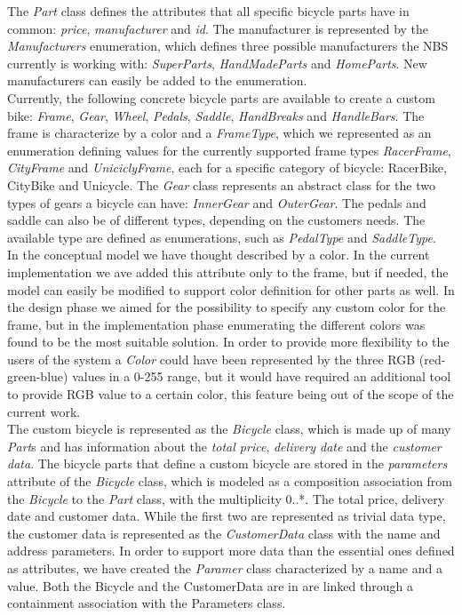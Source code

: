 \noindent The \emph{Part} class defines the attributes that all specific bicycle
parts have in common: \emph{price}, \emph{manufacturer} and \emph{id}. The
manufacturer is represented by the \emph{Manufacturers} enumeration, which
defines three possible manufacturers the NBS currently is working with:
\emph{SuperParts}, \emph{HandMadeParts} and \emph{HomeParts}. New manufacturers
can easily be added to the enumeration.\\

\noindent Currently, the following concrete bicycle parts are available to
create a custom bike: \emph{Frame}, \emph{Gear}, \emph{Wheel}, \emph{Pedals}, \emph{Saddle},
\emph{HandBreaks} and \emph{HandleBars}. The frame is characterize by
a color and a \emph{FrameType}, which we represented as an enumeration defining
values for the currently supported frame types \emph{RacerFrame}, \emph{CityFrame} and
\emph{UniciclyFrame}, each for a specific category of bicycle: RacerBike,
CityBike and Unicycle. The \emph{Gear} class represents an abstract class for
the two types of gears a bicycle can have: \emph{InnerGear} and
\emph{OuterGear}. The pedals and saddle can also be of different types,
depending on the customers needs. The available type are defined as
enumerations, such as \emph{PedalType} and \emph{SaddleType}. \\

\noindent In the conceptual model we have thought described by a color. In the
current implementation we ave added this attribute only to the frame, but if needed, the
model can easily be modified to support color definition for other parts as well.
In the design phase we aimed for the possibility to specify any custom color for
the frame, but in the implementation phase enumerating the different colors was
found to be the most suitable solution. In order to provide more flexibility to
the users of the system a \emph{Color} could have been represented by the three
RGB (red-green-blue) values in a 0-255 range, but it would have required an
additional tool to provide RGB value to a certain color, this feature being out
of the scope of the current work.\\

\noindent The custom bicycle is represented as the \emph{Bicycle} class, which
is made up of many \emph{Part}s and has information about the \emph{total price},
\emph{delivery date} and the \emph{customer data}. The bicycle parts that define
a custom bicycle are stored in the \emph{parameters} attribute of the
\emph{Bicycle} class, which is modeled as a composition association from the
\emph{Bicycle} to the \emph{Part} class, with the multiplicity 0..*. The total
price, delivery date and customer data. While the first two are represented as
trivial data type, the customer data is represented as the \emph{CustomerData}
class with the name and address parameters. In order to support more data than
the essential ones defined as attributes, we have created the \emph{Paramer} class
characterized by a name and a value. Both the Bicycle and the CustomerData are
in are linked through a containment association with the Parameters class.\\

